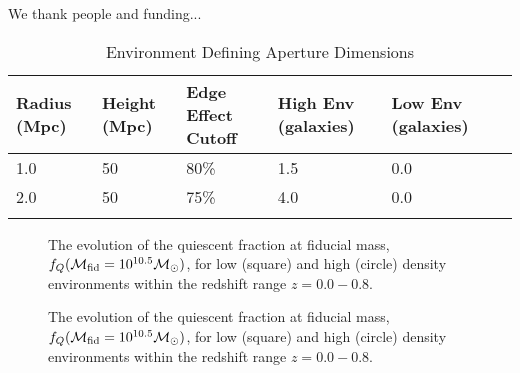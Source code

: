 \documentclass{emulateapj}
\begin{document}
We thank people and funding...
%
%


\appendix
\begin{table*} %
  \caption{Environment Defining Aperture Dimensions}
  \label{tab:aperture}
  \begin{center}
    \leavevmode
    \begin{tabular}{llllll} \hline \hline              
  Radius (Mpc)          &Height (Mpc)      & Edge Effect Cutoff &High Env (galaxies) &Low Env (galaxies) \\ \hline 
  1.0 &50 & 80\% & 1.5 & 0.0          \\
  2.0 &50 & 75\% & 4.0 & 0.0          \\ \hline
  \multicolumn{5}{l}{}                                             \\       
    \end{tabular}
  \end{center}
\end{table*}

\begin{figure*}
    \begin{center}
        \leavevmode
        \caption{The evolution of the quiescent fraction at fiducial mass, $f_{Q}(\mathcal{M}_{\rm{fid}} = 10^{10.5} \mathcal{M}_\odot)$, for low (square) and high (circle) density environments within the redshift range $z = 0.0 - 0.8$.}      
    \end{center}
\end{figure*}

\begin{figure*}
    \begin{center}
        \leavevmode
        \caption{The evolution of the quiescent fraction at fiducial mass, $f_{Q}(\mathcal{M}_{\rm{fid}} = 10^{10.5} \mathcal{M}_\odot)$, for low (square) and high (circle) density environments within the redshift range $z = 0.0 - 0.8$.}
    \end{center}
\end{figure*}
\end{document}
